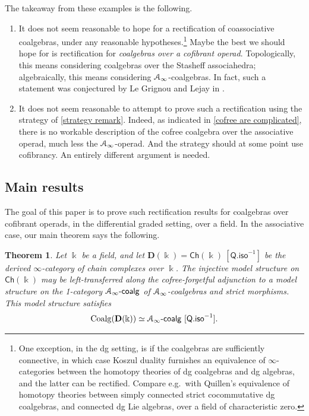 \documentclass[a4paper,12pt]{amsart}
\renewcommand{\mathcal}{\EuScript}
\newtheorem{theoremintro}{Theorem}
\newcommand{\onecoalg}[1]{#1\text{-}\mathsf{coalg}}
\theoremstyle{plain}
\theoremstyle{definition}
\theoremstyle{remark}
\newcommand{\kk}{\Bbbk}
\begin{document}
The takeaway from these examples is the following.
\begin{enumerate}
    \item It does not seem reasonable to hope for a rectification of coassociative coalgebras, under any reasonable hypotheses.\footnote{One exception, in the dg setting, is if the coalgebras are sufficiently connective, in which case Koszul duality furnishes an equivalence of $\infty$-categories between the homotopy theories of dg coalgebras and dg algebras, and the latter can be rectified. Compare e.g.~with Quillen's \cite{quillen69} equivalence of homotopy theories between simply connected strict cocommutative dg coalgebras, and connected dg Lie algebras, over a field of characteristic zero.} Maybe the best we should hope for is rectification for \emph{coalgebras over a cofibrant operad}. Topologically, this means considering coalgebras over the Stasheff associahedra; algebraically, this means considering $\mathcal{A}_\infty$-coalgebras. In fact, such a statement was conjectured by Le Grignou and Lejay in \cite[Conjecture 8.3]{linearcoalgebras}.
    
    \item It does not seem reasonable to attempt to prove such a rectification using the strategy of \cref{strategy remark}. Indeed, as indicated in \cref{cofree are complicated}, there is no workable description of the cofree coalgebra over the associative operad, much less the $\mathcal A_\infty$-operad. And the strategy should at some point use cofibrancy. An entirely different argument is needed.
\end{enumerate}

\subsection{Main results} The goal of this paper is to prove such rectification results for coalgebras over cofibrant operads, in the differential graded setting, over a field. In the associative case, our main theorem says the following.

\begin{theoremintro}\label{thm: main theorem associative case}
Let $\kk$ be a field, and let $\mathbf D(\kk) = \mathsf {Ch}(\kk)~[\mathsf{Q.iso}^{-1}]$ be the derived $\infty$-category of chain complexes over $\kk$. The injective model structure on $\mathsf {Ch}(\kk)$ may be left-transferred along the cofree-forgetful adjunction to a model structure on the 1-category $\onecoalg{\mathcal A_\infty}$ of $\mathcal A_\infty$-coalgebras and strict morphisms. This model structure satisfies
    \[ \mathrm{Coalg}(\mathbf D(\kk)) \simeq \onecoalg{\mathcal A_\infty}~[\mathsf{Q.iso}^{-1}].\]
\end{theoremintro}
\end{document}
